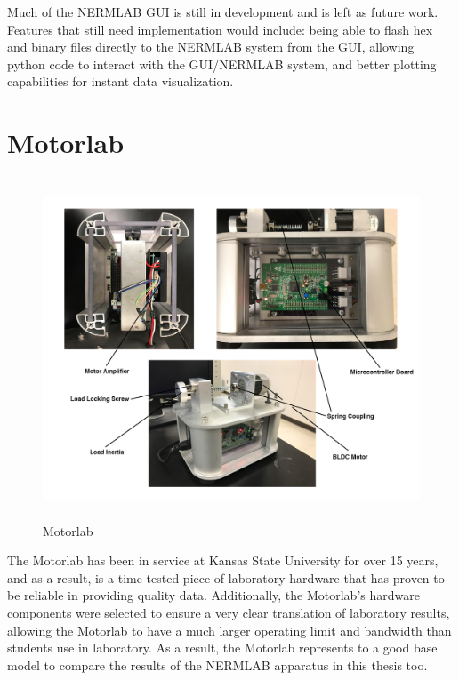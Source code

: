 Much of the NERMLAB GUI is still in development and is left as future work. Features that still need implementation would include: being able to flash hex and binary files directly to the NERMLAB system from the GUI, allowing python code to interact with the GUI/NERMLAB system, and better plotting capabilities for instant data visualization.

\section{Motorlab}
\label{makereference2.2} 

\begin{figure}[H]
	\begin{center}
		\includegraphics[height=4in]{figures/motorlab.png}
		
		\caption[Motorlab]{Motorlab}
		
		\label{motorlab_hardware}
	\end{center}
\end{figure}

The Motorlab has been in service at Kansas State University for over 15 years, and as a result, is a time-tested piece of laboratory hardware that has proven to be reliable in providing quality data. Additionally, the Motorlab's hardware components were selected to ensure a very clear translation of laboratory results, allowing the Motorlab to have a much larger operating limit and bandwidth than students use in laboratory. As a result, the Motorlab represents to a good base model to compare the results of the NERMLAB apparatus in this thesis too.


